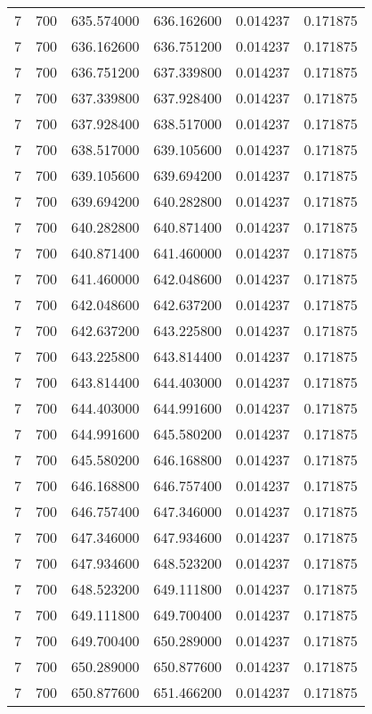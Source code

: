 \begin{longtable}{rrrrrr}
7 & 700 & 635.574000 & 636.162600 & 0.014237 & 0.171875 \\
7 & 700 & 636.162600 & 636.751200 & 0.014237 & 0.171875 \\
7 & 700 & 636.751200 & 637.339800 & 0.014237 & 0.171875 \\
7 & 700 & 637.339800 & 637.928400 & 0.014237 & 0.171875 \\
7 & 700 & 637.928400 & 638.517000 & 0.014237 & 0.171875 \\
7 & 700 & 638.517000 & 639.105600 & 0.014237 & 0.171875 \\
7 & 700 & 639.105600 & 639.694200 & 0.014237 & 0.171875 \\
7 & 700 & 639.694200 & 640.282800 & 0.014237 & 0.171875 \\
7 & 700 & 640.282800 & 640.871400 & 0.014237 & 0.171875 \\
7 & 700 & 640.871400 & 641.460000 & 0.014237 & 0.171875 \\
7 & 700 & 641.460000 & 642.048600 & 0.014237 & 0.171875 \\
7 & 700 & 642.048600 & 642.637200 & 0.014237 & 0.171875 \\
7 & 700 & 642.637200 & 643.225800 & 0.014237 & 0.171875 \\
7 & 700 & 643.225800 & 643.814400 & 0.014237 & 0.171875 \\
7 & 700 & 643.814400 & 644.403000 & 0.014237 & 0.171875 \\
7 & 700 & 644.403000 & 644.991600 & 0.014237 & 0.171875 \\
7 & 700 & 644.991600 & 645.580200 & 0.014237 & 0.171875 \\
7 & 700 & 645.580200 & 646.168800 & 0.014237 & 0.171875 \\
7 & 700 & 646.168800 & 646.757400 & 0.014237 & 0.171875 \\
7 & 700 & 646.757400 & 647.346000 & 0.014237 & 0.171875 \\
7 & 700 & 647.346000 & 647.934600 & 0.014237 & 0.171875 \\
7 & 700 & 647.934600 & 648.523200 & 0.014237 & 0.171875 \\
7 & 700 & 648.523200 & 649.111800 & 0.014237 & 0.171875 \\
7 & 700 & 649.111800 & 649.700400 & 0.014237 & 0.171875 \\
7 & 700 & 649.700400 & 650.289000 & 0.014237 & 0.171875 \\
7 & 700 & 650.289000 & 650.877600 & 0.014237 & 0.171875 \\
7 & 700 & 650.877600 & 651.466200 & 0.014237 & 0.171875 \\

\end{longtable}
